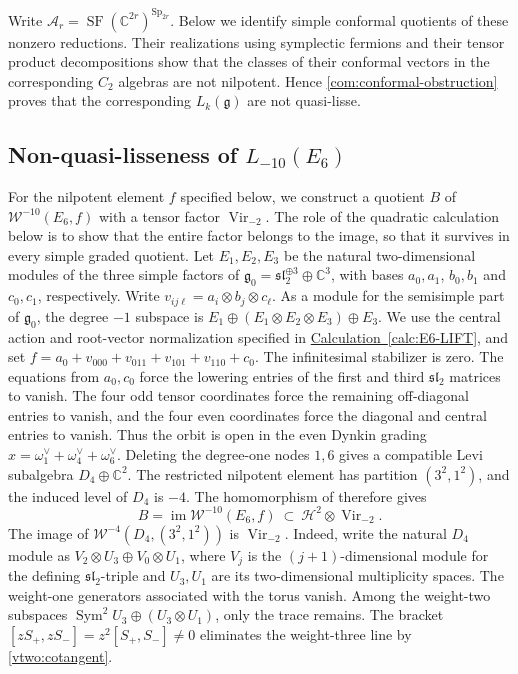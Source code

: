 \documentclass[11pt,a4paper]{amsart}
\numberwithin{equation}{section}
\theoremstyle{definition}
\theoremstyle{remark}
\newcommand{\C}{\mathbb C}
\newcommand{\g}{\mathfrak g}
\newcommand{\slg}{\mathfrak{sl}}
\newcommand{\SF}{\operatorname{SF}}
\newcommand{\Sp}{\operatorname{Sp}}
\newcommand{\Vir}{\operatorname{Vir}}
\newcommand{\im}{\operatorname{im}}
\newcommand{\Sym}{\operatorname{Sym}}
\begin{document}
Write $\mathcal A_r=\SF(\C^{2r})^{\Sp_{2r}}$. Below we identify simple conformal
quotients of these nonzero reductions. Their realizations using
symplectic fermions and their tensor product decompositions show that
the classes of their conformal vectors in the corresponding $C_2$
algebras are not nilpotent. Hence
\cref{com:conformal-obstruction} proves that the corresponding
$L_k(\g)$ are not quasi-lisse.

\subsection{\texorpdfstring{Non-quasi-lisseness of $L_{-10}(E_6)$}{Non-quasi-lisseness of L-10(E6)}}
For the nilpotent element $f$ specified below, we construct a quotient
$B$ of $\mathcal W^{-10}(E_6,f)$ with a tensor factor $\Vir_{-2}$. The role of the quadratic calculation below is to show that
the entire factor belongs to the image, so that it survives in every
simple graded quotient.
Let $E_1,E_2,E_3$ be the natural two-dimensional modules of the
three simple factors of $\g_0=\slg_2^{\oplus3}\oplus\C^3$, with bases
$a_0,a_1$, $b_0,b_1$ and $c_0,c_1$, respectively. Write
$v_{ij\ell}=a_i\otimes b_j\otimes c_\ell$. As a module for the
semisimple part of $\g_0$, the degree $-1$ subspace is
$E_1\oplus(E_1\otimes E_2\otimes E_3)\oplus E_3$.
We use the central action and root-vector normalization specified in
\hyperref[calc:E6-LIFT]{Calculation~\ref*{calc:E6-LIFT}}, and set
$
 f=a_0+v_{000}+v_{011}+v_{101}+v_{110}+c_0.
$ 
The infinitesimal stabilizer is zero. The equations from $a_0,c_0$
force the lowering entries of the first and third $\slg_2$ matrices
to vanish. The four odd tensor coordinates force the remaining
off-diagonal entries to vanish, and the four even coordinates force
the diagonal and central entries to vanish. Thus the orbit is
open in the even Dynkin grading $x=\omega_1^\vee+\omega_4^\vee+
\omega_6^\vee$. Deleting the degree-one nodes $1,6$ gives a compatible
Levi subalgebra $D_4\oplus\C^2$. The restricted nilpotent element has
partition $(3^2,1^2)$, and the induced level of $D_4$ is $-4$.
The homomorphism of \cite[Theorem~5.10]{Genra} therefore gives
$$
 B=\im\mathcal W^{-10}(E_6,f)\ \subset\ \mathcal H^2\otimes\Vir_{-2}.
$$
The image of $\mathcal W^{-4}(D_4,(3^2,1^2))$ is $\Vir_{-2}$.
Indeed, write the natural $D_4$ module as
$V_2\otimes U_3\oplus V_0\otimes U_1$, where $V_j$ is the
$(j+1)$-dimensional module for the defining $\slg_2$-triple and
$U_3,U_1$ are its two-dimensional multiplicity spaces. The weight-one
generators associated with the torus vanish. Among the weight-two
subspaces $\Sym^2U_3\oplus(U_3\otimes U_1)$, only the trace remains.
The bracket $[zS_+,zS_-]=z^2[S_+,S_-]\ne0$ eliminates the weight-three
line by \cref{vtwo:cotangent}. 
\end{document}
